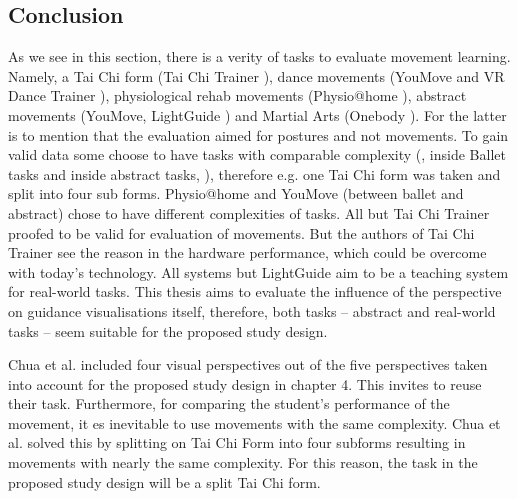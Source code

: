 \subsection{Conclusion}
As we see in this section, there is a verity of tasks to evaluate movement learning. Namely, a Tai Chi form (Tai Chi Trainer \cite{Chua2003}), dance movements (YouMove \cite{Anderson2013a} and VR Dance Trainer \cite{Chan2010}), physiological rehab movements (Physio@home \cite{Tang2015}), abstract movements (YouMove, LightGuide \cite{Sodhi2012}) and Martial Arts (Onebody \cite{Hoang2016}). For the latter is to mention that the evaluation aimed for postures and not movements. To gain valid data some choose to have tasks with comparable complexity (\cite{Chua2003}, \cite{Anderson2013a} inside Ballet tasks and inside abstract tasks, \cite{Sodhi2012}), therefore e.g. one Tai Chi form was taken and split into four sub forms. Physio@home and YouMove (between ballet and abstract) chose to have different complexities of tasks. All but Tai Chi Trainer proofed to be valid for evaluation of movements. But the authors of Tai Chi Trainer see the reason in the hardware performance, which could be overcome with today's technology. All systems but LightGuide aim to be a teaching system for real-world tasks. This thesis aims to evaluate the influence of the perspective on guidance visualisations itself, therefore, both tasks \--- abstract and real-world tasks \--- seem suitable for the proposed study design.
\begin{tcolorbox}[colback=red!30!white]
Chua et al. included four visual perspectives out of the five perspectives taken into account for the proposed study design in chapter 4. This invites to reuse their task. Furthermore, for comparing the student's performance of the movement, it es inevitable to use movements with the same complexity. Chua et al. solved this by splitting on Tai Chi Form into four subforms resulting in movements with nearly the same complexity. For this reason, the task in the proposed study design will be a split Tai Chi form.
\end{tcolorbox}

\newpage

